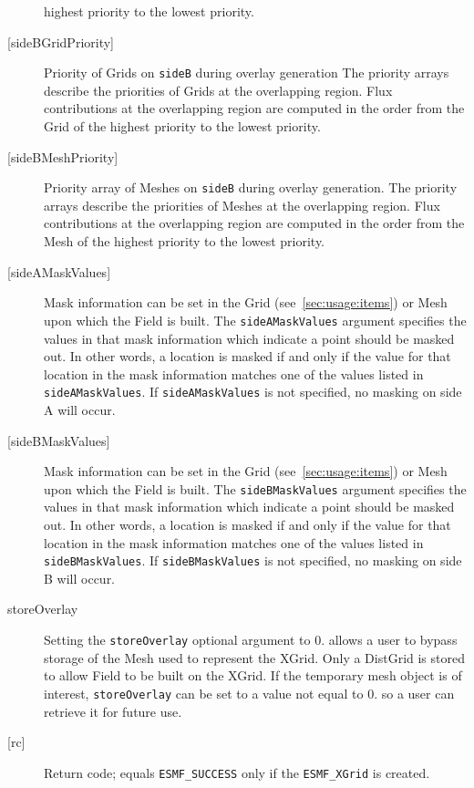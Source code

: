 \begin{description}
             highest priority to the lowest priority.
       \item [{[sideBGridPriority]}]
             Priority of Grids on {\tt sideB} during overlay generation
             The priority arrays describe the priorities of Grids at the overlapping region.
             Flux contributions at the overlapping region are computed in the order from the Grid of the
             highest priority to the lowest priority.
       \item [{[sideBMeshPriority]}]
             Priority array of Meshes on {\tt sideB} during overlay generation.
             The priority arrays describe the priorities of Meshes at the overlapping region.
             Flux contributions at the overlapping region are computed in the order from the Mesh of the
             highest priority to the lowest priority.
       \item [{[sideAMaskValues]}]
             Mask information can be set in the Grid (see~\ref{sec:usage:items}) or Mesh
             upon which the Field is built. The {\tt sideAMaskValues} argument specifies the values in that 
             mask information which indicate a point should be masked out. In other words, a location is masked if and only if the
             value for that location in the mask information matches one of the values listed in {\tt sideAMaskValues}.  
             If {\tt sideAMaskValues} is not specified, no masking on side A will occur. 
       \item [{[sideBMaskValues]}]
             Mask information can be set in the Grid (see~\ref{sec:usage:items}) or Mesh
             upon which the Field is built. The {\tt sideBMaskValues} argument specifies the values in that 
             mask information which indicate a point should be masked out. In other words, a location is masked if and only if the
             value for that location in the mask information matches one of the values listed in {\tt sideBMaskValues}.  
             If {\tt sideBMaskValues} is not specified, no masking on side B will occur. 
       \item [storeOverlay]
             Setting the {\tt storeOverlay} optional argument to 0. 
             allows a user to bypass storage of the Mesh used to represent the XGrid.
             Only a DistGrid is stored to allow Field to be built on the XGrid.
             If the temporary mesh object is of interest, {\tt storeOverlay} can be set to a value not equal to 0.
             so a user can retrieve it for future use.
       \item [{[rc]}]
             Return code; equals {\tt ESMF\_SUCCESS} only if the {\tt ESMF\_XGrid} 
             is created.
       \end{description}
   
